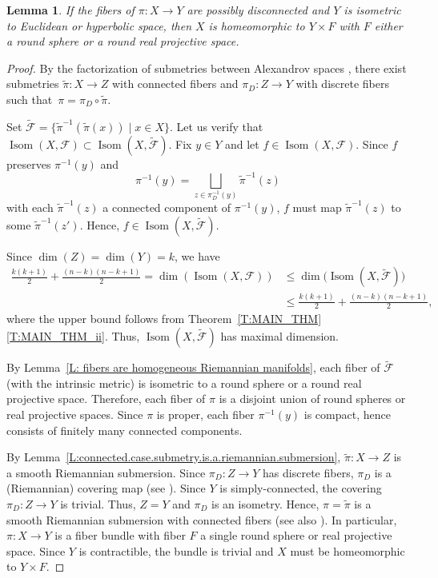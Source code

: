 \documentclass[pdftex]{sigma}
\numberwithin{equation}{section}
\newtheorem{lem}[thm]{Lemma}
\theoremstyle{definition}
\DeclareMathOperator{\Iso}{Isom}
\newcommand{\fol}{\mathcal{F}}
\begin{document}
\begin{lem}
\label{L:disconnected.fibers.Y.is.Rk}
If the fibers of $\pi\colon X\to Y$ are possibly disconnected and $Y$ is isometric to Euclidean or hyperbolic space, then $X$ is homeomorphic to $Y\times F$ with $F$ either a round sphere or a round real projective space.
\end{lem}

\begin{proof}

By the factorization of submetries between Alexandrov spaces \cite[Theorem 10.1]{Lytchak}, there exist submetries
$\tilde{\pi}\colon X\to Z$ with connected fibers and $\pi_D\colon Z\to Y$ with discrete fibers such that~${\pi = \pi_D\circ\tilde{\pi}}$.

Set
$\tilde{\fol} =\big\{\tilde{\pi}^{-1}(\tilde{\pi}(x))\mid x\in X\big\}$.
Let us verify that $\Iso(X,\fol)\subset \Iso(X,\tilde{\fol})$.
Fix $y\in Y$ and let $f\in \Iso(X,\fol)$.
Since $f$ preserves $\pi^{-1}(y)$ and
\[
\pi^{-1}(y) = \bigsqcup_{z\in \pi^{-1}_D(y)}\tilde{\pi}^{-1}(z)
\]
with each $\tilde{\pi}^{-1}(z)$ a connected component of $\pi^{-1}(y)$, $f$ must map $\tilde{\pi}^{-1}(z)$ to some $\tilde{\pi}^{-1}(z')$.
Hence, $f\in\Iso(X,\tilde{\fol})$.

Since
$\dim(Z) = \dim(Y) = k$,
we have
\begin{align*}
\frac{k(k+1)}{2}+\frac{(n-k)(n-k+1)}{2}=\dim(\Iso(X,\fol))&\leq \dim\bigl(\Iso(X,\tilde{\fol})\bigr)\\
&\leq \frac{k(k+1)}{2}+\frac{(n-k)(n-k+1)}{2},
\end{align*}
where the upper bound follows from Theorem~\ref{T:MAIN_THM}\,\ref{T:MAIN_THM_ii}.
Thus, $\Iso(X,\tilde{\fol})$ has maximal dimension.

By Lemma~\ref{L: fibers are homogeneous Riemannian manifolds}, each fiber of $\tilde{\fol}$ (with the intrinsic metric) is isometric to a round sphere or a round real projective space. Therefore, each fiber of $\pi$ is a disjoint union of round spheres or real projective spaces.
Since $\pi$ is proper, each fiber $\pi^{-1}(y)$ is compact, hence consists of finitely many connected components.

By Lemma~\ref{L:connected.case.submetry.is.a.riemannian.submersion}, $\tilde{\pi}\colon X\to Z$ is a smooth Riemannian submersion.
Since $\pi_D\colon Z\to Y$ has discrete fibers, $\pi_D$ is a (Riemannian) covering map (see \cite[Theorem 1.2]{Lange2020}). Since $Y$ is simply-connected, the covering $\pi_D\colon Z\to Y$ is trivial. Thus, $Z = Y$ and $\pi_D$ is an isometry. Hence, $\pi = \tilde{\pi}$ is a smooth Riemannian submersion with connected fibers (see also \cite{LytchakWilking2024}). In particular, $\pi\colon X\to Y$ is a fiber bundle with fiber $F$ a single round sphere or real projective space.
Since $Y$ is contractible, the bundle is trivial and $X$ must be homeomorphic to $Y\times F$.
\end{proof}
\end{document}
